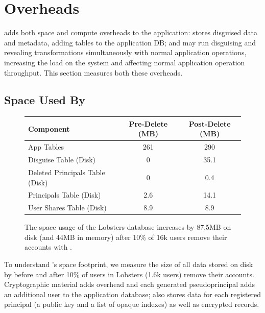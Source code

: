 \section{\sys Overheads}
\label{s:eval-overheads}

\sys adds both space and compute overheads to the application: \sys stores
disguised data and metadata, adding tables to the application DB; and \sys may
run disguising and revealing transformations simultaneously with normal
application operations, increasing the load on the system and affecting normal
application operation throughput.
%
This section measures both these overheads.

\subsection{Space Used By \sys}

\begin{figure}[t]
\centering
\begin{tabular}{lcc}
    \textbf{Component} & \textbf{Pre-Delete (MB)} & \textbf{Post-Delete (MB)} \\
\hline
    App Tables & 261 & 290\\
    Disguise Table (Disk) & 0 & 35.1\\
    Deleted Principals Table (Disk) & 0 & 0.4\\
    Principals Table (Disk) & 2.6 & 14.1 \\
    User Shares Table (Disk) & 8.9 & 8.9\\
\end{tabular}
    \caption[Space overhead of \sys.]{The space usage of the Lobsters-\sys database increases by 87.5MB on disk (and 44MB
    in memory) after 10\% of 16k
    users remove their accounts with \sys.}
    \label{f:storage}
\end{figure}

%
To understand \sys's space footprint, we measure the size of all data stored
on disk by \sys before and after 10\% of users in Lobsters (1.6k users)
remove their accounts.
%
%
Cryptographic material adds overhead and each generated pseudoprincipal adds an
additional user to the application database; \sys also stores data for each
registered principal (a public key and a list of opaque indexes) as well as
encrypted records.
%
%

